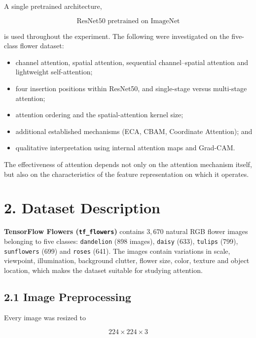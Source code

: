 \documentclass[10pt]{article}
\begin{document}
A single pretrained architecture,

\[
\boxed{\text{ResNet50 pretrained on ImageNet}}
\]

is used throughout the experiment. The following were investigated on the
five-class flower dataset:

\begin{itemize}
\item channel attention, spatial attention, sequential channel--spatial attention and lightweight self-attention;
\item four insertion positions within ResNet50, and single-stage versus multi-stage attention;
\item attention ordering and the spatial-attention kernel size;
\item additional established mechanisms (ECA, CBAM, Coordinate Attention); and
\item qualitative interpretation using internal attention maps and Grad-CAM.
\end{itemize}

The effectiveness of attention depends not only on the attention mechanism
itself, but also on the characteristics of the feature representation on
which it operates.

\section*{2. Dataset Description}

\textbf{TensorFlow Flowers (\texttt{tf\_flowers})} contains $3{,}670$ natural
RGB flower images belonging to five classes: \texttt{dandelion} (898 images),
\texttt{daisy} (633), \texttt{tulips} (799), \texttt{sunflowers} (699) and
\texttt{roses} (641). The images contain variations in scale, viewpoint,
illumination, background clutter, flower size, color, texture and object
location, which makes the dataset suitable for studying attention.

\subsection*{2.1 Image Preprocessing}

Every image was resized to

\[
224\times224\times3
\]
\end{document}
